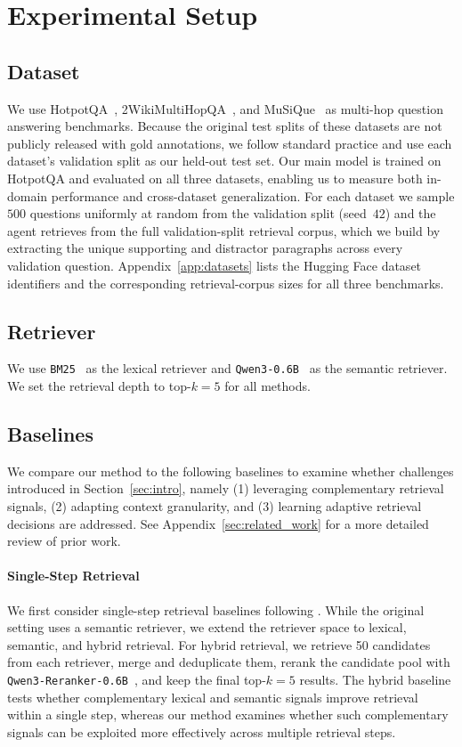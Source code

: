 \documentclass[11pt]{article}
\begin{document}
\section{Experimental Setup}
\subsection{Dataset}
We use HotpotQA~\cite{yang2018hotpotqa}, 2WikiMultiHopQA~\cite{ho2020constructing}, and MuSiQue~\cite{trivedi2022musique} as multi-hop question answering benchmarks. Because the original test splits of these datasets are not publicly released with gold annotations, we follow standard practice and use each dataset's validation split as our held-out test set. Our main model is trained on HotpotQA and evaluated on all three datasets, enabling us to measure both in-domain performance and cross-dataset generalization. For each dataset we sample $500$ questions uniformly at random from the validation split (seed~$42$) and the agent retrieves from the full validation-split retrieval corpus, which we build by extracting the unique supporting and distractor paragraphs across every validation question. Appendix~\ref{app:datasets} lists the Hugging Face dataset identifiers and the corresponding retrieval-corpus sizes for all three benchmarks.


\subsection{Retriever}
We use \texttt{BM25}~\cite{robertson2009probabilistic} as the lexical retriever and \texttt{Qwen3-0.6B}~\cite{qwen3technicalreport} as the semantic retriever. We set the retrieval depth to top-$k=5$ for all methods.

\subsection{Baselines}
We compare our method to the following baselines to examine whether challenges introduced in Section~\ref{sec:intro}, namely (1) leveraging complementary retrieval signals, (2) adapting context granularity, and (3) learning adaptive retrieval decisions are addressed. See Appendix~\ref{sec:related_work} for a more detailed review of prior work.

\paragraph{Single-Step Retrieval}
We first consider single-step retrieval baselines following \citet{jin2025search}. While the original setting uses a semantic retriever, we extend the retriever space to lexical, semantic, and hybrid retrieval. For hybrid retrieval, we retrieve 50 candidates from each retriever, merge and deduplicate them, rerank the candidate pool with \texttt{Qwen3-Reranker-0.6B}~\cite{qwen3embedding}, and keep the final top-$k=5$ results. The hybrid baseline tests whether complementary lexical and semantic signals improve retrieval within a single step, whereas our method examines whether such complementary signals can be exploited more effectively across multiple retrieval steps.
\end{document}
